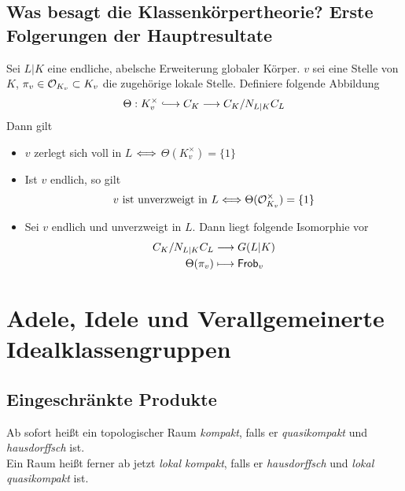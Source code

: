 \documentclass{book}
\newcommand{\Frob}{\textsf{Frob}}
\begin{document}
\section{Was besagt die Klassenkörpertheorie? Erste Folgerungen der Hauptresultate}
\Satz{}
Sei $L|K$ eine endliche, abelsche Erweiterung globaler Körper. $v$ sei eine Stelle von $K$, $\pi_v \in \mathcal{O}_{K_v} \subset K_v$ die zugehörige lokale Stelle. Definiere folgende Abbildung
\[ \Theta : K_v^\times \Inj{} C_K \Pfeil{} C_K/N_{L|K}C_L \]
Dann gilt
\begin{itemize}
\item $v$ zerlegt sich voll in $L$ $\overset{}{\Longleftrightarrow}$ $\Theta(K_v^\times) = \{1\}$
\item Ist $v$ endlich, so gilt
\[ v \text{ ist unverzweigt in }L\overset{}{\Longleftrightarrow} \Theta(\mathcal{O}_{K_v}^\times) = \{1\} \]
\item Sei $v$ endlich und unverzweigt in $L$. Dann liegt folgende Isomorphie vor
\begin{align*}
C_K / N_{L|K}C_L &\Pfeil{} G(L|K)\\
\Theta(\pi_v) & \longmapsto \Frob_v
\end{align*}
\end{itemize}

\chapter{Adele, Idele und Verallgemeinerte Idealklassengruppen}
\section{Eingeschränkte Produkte}
\Bem{}
Ab sofort heißt ein topologischer Raum \textit{kompakt}, falls er \textit{quasikompakt} und \textit{hausdorffsch} ist.\\
Ein Raum heißt ferner ab jetzt \textit{lokal kompakt}, falls er \textit{hausdorffsch} und \textit{lokal quasikompakt} ist.
\end{document}

